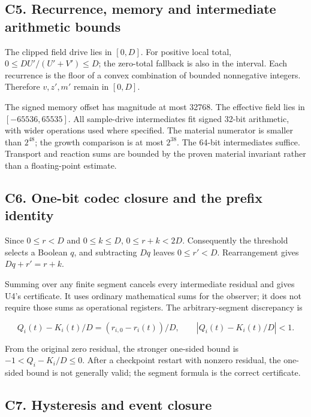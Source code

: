 \documentclass[11pt,a4paper]{article}
\begin{document}
\subsection{C5. Recurrence, memory and intermediate arithmetic
bounds}\label{c5.-recurrence-memory-and-intermediate-arithmetic-bounds}

The clipped field drive lies in \([0,D]\). For positive local total,
\(0\le DU'/(U'+V')\le D\); the zero-total fallback is also in the
interval. Each recurrence is the floor of a convex combination of
bounded nonnegative integers. Therefore \(v,z',m'\) remain in \([0,D]\).

The signed memory offset has magnitude at most 32768. The effective
field lies in \([-65536,65535]\). All sample-drive intermediates fit
signed 32-bit arithmetic, with wider operations used where specified.
The material numerator is smaller than \(2^{48}\); the growth comparison
is at most \(2^{38}\). The 64-bit intermediates suffice. Transport and
reaction sums are bounded by the proven material invariant rather than a
floating-point estimate.

\subsection{C6. One-bit codec closure and the prefix
identity}\label{c6.-one-bit-codec-closure-and-the-prefix-identity}

Since \(0\le r<D\) and \(0\le k\le D\), \(0\le r+k<2D\). Consequently
the threshold selects a Boolean \(q\), and subtracting \(Dq\) leaves
\(0\le r'<D\). Rearrangement gives \(Dq+r'=r+k\).

Summing over any finite segment cancels every intermediate residual and
gives U4's certificate. It uses ordinary mathematical sums for the
observer; it does not require those sums as operational registers. The
arbitrary-segment discrepancy is

\[
Q_i(t)-K_i(t)/D=(r_{i,0}-r_i(t))/D,\qquad
\left|Q_i(t)-K_i(t)/D\right|<1.
\]

From the original zero residual, the stronger one-sided bound is
\(-1<Q_i-K_i/D\le0\). After a checkpoint restart with nonzero residual,
the one-sided bound is not generally valid; the segment formula is the
correct certificate.

\subsection{C7. Hysteresis and event
closure}\label{c7.-hysteresis-and-event-closure}
\end{document}
